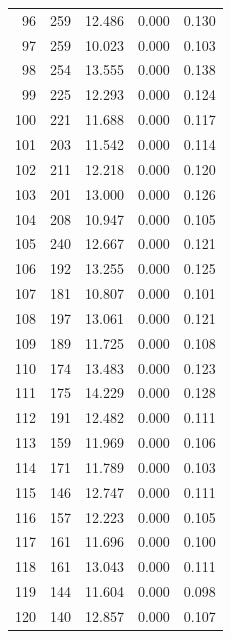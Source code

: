 \begin{table}
\begin{tabular}{rrrrr}
  96 &    259 &         12.486 &        0.000 &           0.130 \\
  97 &    259 &         10.023 &        0.000 &           0.103 \\
  98 &    254 &         13.555 &        0.000 &           0.138 \\
  99 &    225 &         12.293 &        0.000 &           0.124 \\
 100 &    221 &         11.688 &        0.000 &           0.117 \\
 101 &    203 &         11.542 &        0.000 &           0.114 \\
 102 &    211 &         12.218 &        0.000 &           0.120 \\
 103 &    201 &         13.000 &        0.000 &           0.126 \\
 104 &    208 &         10.947 &        0.000 &           0.105 \\
 105 &    240 &         12.667 &        0.000 &           0.121 \\
 106 &    192 &         13.255 &        0.000 &           0.125 \\
 107 &    181 &         10.807 &        0.000 &           0.101 \\
 108 &    197 &         13.061 &        0.000 &           0.121 \\
 109 &    189 &         11.725 &        0.000 &           0.108 \\
 110 &    174 &         13.483 &        0.000 &           0.123 \\
 111 &    175 &         14.229 &        0.000 &           0.128 \\
 112 &    191 &         12.482 &        0.000 &           0.111 \\
 113 &    159 &         11.969 &        0.000 &           0.106 \\
 114 &    171 &         11.789 &        0.000 &           0.103 \\
 115 &    146 &         12.747 &        0.000 &           0.111 \\
 116 &    157 &         12.223 &        0.000 &           0.105 \\
 117 &    161 &         11.696 &        0.000 &           0.100 \\
 118 &    161 &         13.043 &        0.000 &           0.111 \\
 119 &    144 &         11.604 &        0.000 &           0.098 \\
 120 &    140 &         12.857 &        0.000 &           0.107 \\

\end{tabular}
\end{table}
